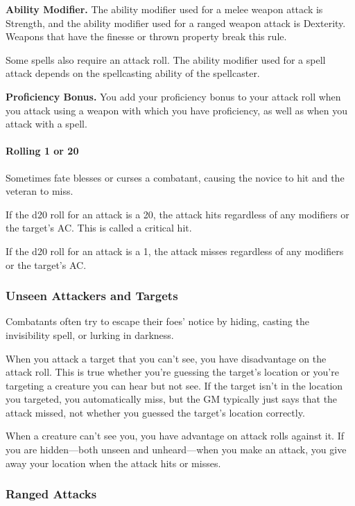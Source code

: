 \documentclass[
]{article}
\begin{document}
\textbf{Ability Modifier.} The ability modifier used for a melee weapon
attack is Strength, and the ability modifier used for a ranged weapon
attack is Dexterity. Weapons that have the finesse or thrown property
break this rule.

Some spells also require an attack roll. The ability modifier used for a
spell attack depends on the spellcasting ability of the spellcaster.

\textbf{Proficiency Bonus.} You add your proficiency bonus to your
attack roll when you attack using a weapon with which you have
proficiency, as well as when you attack with a spell.

\hypertarget{rolling-1-or-20}{%
\paragraph{Rolling 1 or 20}\label{rolling-1-or-20}}

Sometimes fate blesses or curses a combatant, causing the novice to hit
and the veteran to miss.

If the d20 roll for an attack is a 20, the attack hits regardless of any
modifiers or the target's AC. This is called a critical hit.

If the d20 roll for an attack is a 1, the attack misses regardless of
any modifiers or the target's AC.

\hypertarget{unseen-attackers-and-targets}{%
\subsubsection{Unseen Attackers and
Targets}\label{unseen-attackers-and-targets}}

Combatants often try to escape their foes' notice by hiding, casting the
invisibility spell, or lurking in darkness.

When you attack a target that you can't see, you have disadvantage on
the attack roll. This is true whether you're guessing the target's
location or you're targeting a creature you can hear but not see. If the
target isn't in the location you targeted, you automatically miss, but
the GM typically just says that the attack missed, not whether you
guessed the target's location correctly.

When a creature can't see you, you have advantage on attack rolls
against it. If you are hidden---both unseen and unheard---when you make
an attack, you give away your location when the attack hits or misses.

\hypertarget{ranged-attacks}{%
\subsubsection{Ranged Attacks}\label{ranged-attacks}}
\end{document}
